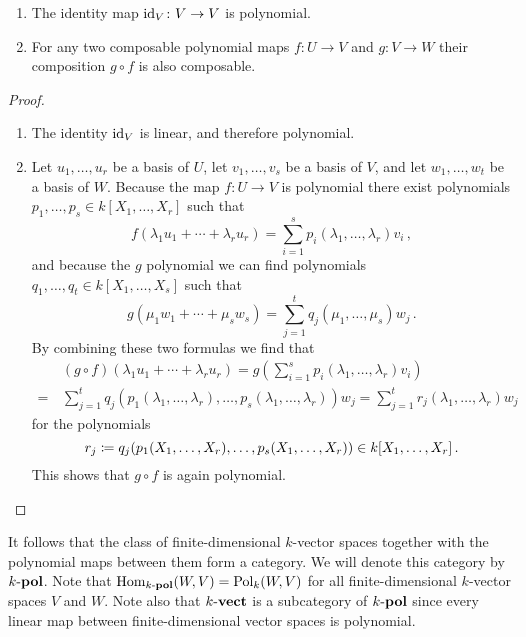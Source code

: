 \begin{lemma}
  \leavevmode
  \begin{enumerate}
    \item
      The identity map $\operatorname{id}_V \colon V \to V$ is polynomial.
    \item
      For any two composable polynomial maps $f \colon U \to V$ and $g \colon V \to W$ their composition $g \circ f$ is also composable.
  \end{enumerate}
\end{lemma}
\begin{proof}
  \leavevmode
  \begin{enumerate}
    \item
      The identity $\operatorname{id}_V$ is linear, and therefore polynomial.
    \item
      Let $u_1, \dotsc, u_r$ be a basis of $U$, let $v_1, \dotsc, v_s$ be a basis of $V$, and let $w_1, \dotsc, w_t$ be a basis of $W$.
      Because the map $f \colon U \to V$ is polynomial there exist polynomials $p_1, \dotsc, p_s \in k[X_1, \dotsc, X_r]$ such that
      \[
          f( \lambda_1 u_1 + \dotsb + \lambda_r u_r )
        = \sum_{i=1}^s p_i(\lambda_1, \dotsc, \lambda_r) v_i \,,
      \]
      and because  the $g$ polynomial we can find polynomials $q_1, \dotsc, q_t \in k[X_1, \dotsc, X_s]$ such that
      \[
          g( \mu_1 w_1 + \dotsb + \mu_s w_s )
        = \sum_{j=1}^t q_j(\mu_1, \dotsc, \mu_s) w_j \,.
      \]
      By combining these two formulas we find that
      \begin{align*}
         &\,  (g \circ f)( \lambda_1 u_1 + \dotsb + \lambda_r u_r)
        =     g
              \left(
                \sum_{i=1}^s p_i(\lambda_1, \dotsc, \lambda_r) v_i
              \right) \\
        =&\,  \sum_{j=1}^t
              q_j
              (
              p_1(\lambda_1, \dotsc, \lambda_r),
              \dotsc,
              p_s(\lambda_1, \dotsc, \lambda_r)
              )
              w_j
        =  \sum_{j=1}^t r_j(\lambda_1, \dotsc, \lambda_r) w_j
      \end{align*}
      for the polynomials
      \[
                  r_j
        \coloneqq  q_j(p_1(X_1, \dotsc, X_r), \dotsc, p_s(X_1, \dotsc, X_r))
        \in       k[X_1, \dotsc, X_r] \,.
      \]
      This shows that $g \circ f$ is again polynomial.
  \qedhere
  \end{enumerate}
\end{proof}


\begin{remark}
  \label{remark: category of polynomial vector spaces}
  It follows that the class of finite-dimensional $k$-vector spaces together with the polynomial maps between them form a category.
  We will denote this category by $k\text{-}\mathbf{pol}$.
  Note that $\operatorname{Hom}_{k\text{-}\mathbf{pol}}(W,V) = \operatorname{Pol}_k(W,V)$ for all finite-dimensional $k$-vector spaces $V$ and $W$.
  Note also that $k\text{-}\mathbf{vect}$ is a subcategory of $k\text{-}\mathbf{pol}$ since every linear map between finite-dimensional vector spaces is polynomial.
\end{remark}


